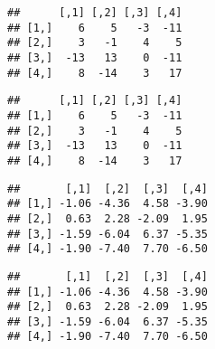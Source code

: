 \documentclass[]{article}
\newenvironment{Shaded}{\begin{snugshade}}{\end{snugshade}}
\newcommand{\KeywordTok}[1]{\textcolor[rgb]{0.13,0.29,0.53}{\textbf{#1}}}
\newcommand{\NormalTok}[1]{#1}
\newcommand{\OperatorTok}[1]{\textcolor[rgb]{0.81,0.36,0.00}{\textbf{#1}}}
\newcommand{\StringTok}[1]{\textcolor[rgb]{0.31,0.60,0.02}{#1}}
\begin{document}
\begin{verbatim}
##      [,1] [,2] [,3] [,4]
## [1,]    6    5   -3  -11
## [2,]    3   -1    4    5
## [3,]  -13   13    0  -11
## [4,]    8  -14    3   17
\end{verbatim}

\begin{Shaded}
\end{Shaded}

\begin{verbatim}
##      [,1] [,2] [,3] [,4]
## [1,]    6    5   -3  -11
## [2,]    3   -1    4    5
## [3,]  -13   13    0  -11
## [4,]    8  -14    3   17
\end{verbatim}

\begin{Shaded}
\end{Shaded}

\begin{verbatim}
##       [,1]  [,2]  [,3]  [,4]
## [1,] -1.06 -4.36  4.58 -3.90
## [2,]  0.63  2.28 -2.09  1.95
## [3,] -1.59 -6.04  6.37 -5.35
## [4,] -1.90 -7.40  7.70 -6.50
\end{verbatim}

\begin{Shaded}
\end{Shaded}

\begin{verbatim}
##       [,1]  [,2]  [,3]  [,4]
## [1,] -1.06 -4.36  4.58 -3.90
## [2,]  0.63  2.28 -2.09  1.95
## [3,] -1.59 -6.04  6.37 -5.35
## [4,] -1.90 -7.40  7.70 -6.50
\end{verbatim}
\end{document}
